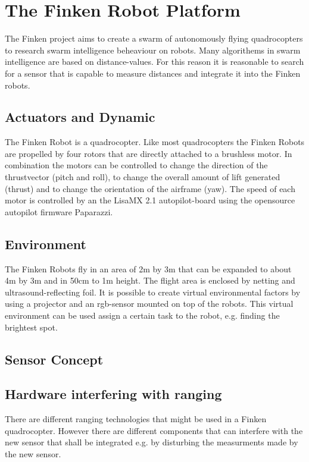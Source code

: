 \section{The Finken Robot Platform}


The Finken project aims to create a swarm of autonomously flying quadrocopters to research swarm intelligence beheaviour on robots.
Many algorithems in swarm intelligence are based on distance-values. 
For this reason it is reasonable to search for a sensor that is capable to measure distances and integrate it into the Finken robots. 

\subsection{Actuators and Dynamic} 
The Finken Robot is a quadrocopter.
Like most quadrocopters the Finken Robots are propelled by four rotors that are directly attached to a brushless motor.
In combination the motors can be controlled to change the direction of the thrustvector (pitch and roll), to change the overall amount of lift generated (thrust) and to change the orientation of the airframe (yaw).
The speed of each motor is controlled by an the Lisa\/MX 2.1 autopilot-board\cite{_lisa/mx_????} using the opensource autopilot firmware Paparazzi\cite{_paparazziuav_????}.

\subsection{Environment}
The Finken Robots fly in an area of 2m by 3m that can be expanded to about 4m by 3m and in 50cm to 1m height.
The flight area is enclosed by netting and ultrasound-reflecting foil.
It is possible to create virtual environmental factors by using a projector and an rgb-sensor mounted on top of the robots.
This virtual environment can be used assign a certain task to the robot, e.g. finding the brightest spot.

\subsection{Sensor Concept}

\subsection{Hardware interfering with ranging}
There are different ranging technologies that might be used in a Finken quadrocopter.
However there are different components that can interfere with the new sensor that shall be integrated e.g. by disturbing the measurments made by the new sensor.

